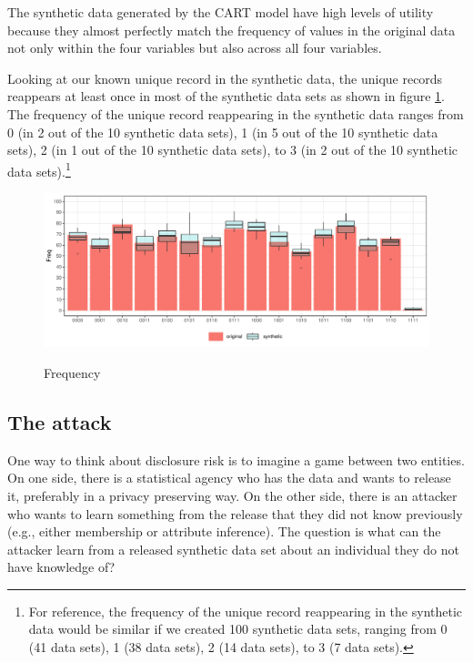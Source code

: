 \documentclass[a4paper,11pt]{style/uneceart}
\begin{document}
The synthetic data generated by the CART model have high levels of utility because they almost perfectly match the frequency of values in the original data not only within the four variables but also across all four variables. 

Looking at our known unique record in the synthetic data, the unique records reappears at least once in most of the synthetic data sets as shown in figure \ref{fig:cart_histogram_compare_10}.  The frequency of the unique record reappearing in the synthetic data ranges from 0 (in 2 out of the 10 synthetic data sets), 1 (in 5 out of the 10 synthetic data sets), 2 (in 1 out of the 10 synthetic data sets), to 3 (in 2 out of the 10 synthetic data sets).\footnote{For reference, the frequency of the unique record reappearing in the synthetic data would be similar if we created 100 synthetic data sets, ranging from 0 (41 data sets), 1 (38 data sets), 2 (14 data sets), to 3 (7 data sets).}  

\begin{figure}[!h]
    \centering
    \caption{Frequency}
    \includegraphics[width=\textwidth]{../../graphs/graph_cart_histogram_compare_10_v1.pdf}
    \label{fig:cart_histogram_compare_10}
\end{figure}


\subsection{The attack}

One way to think about disclosure risk is to imagine a game between two entities.  On one side, there is a statistical agency who has the data and wants to release it, preferably in a privacy preserving way.  On the other side, there is an attacker who wants to learn something from the release that they did not know previously (e.g., either membership or attribute inference). The question is what can the attacker learn from a released synthetic data set about an individual they do not have knowledge of?
\end{document}
